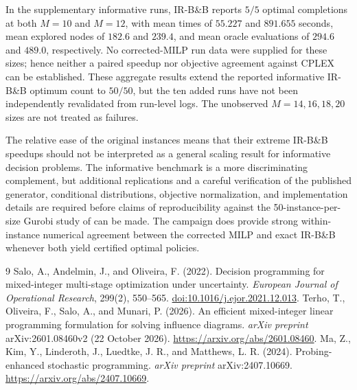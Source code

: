 \documentclass[11pt,a4paper]{article}
\begin{document}
In the supplementary informative runs, IR-B\&B reports $5/5$ optimal completions at both $M=10$ and $M=12$, with mean times of $55.227$ and $891.655$ seconds, mean explored nodes of $182.6$ and $239.4$, and mean oracle evaluations of $294.6$ and $489.0$, respectively. No corrected-MILP run data were supplied for these sizes; hence neither a paired speedup nor objective agreement against CPLEX can be established. These aggregate results extend the reported informative IR-B\&B optimum count to $50/50$, but the ten added runs have not been independently revalidated from run-level logs. The unobserved $M=14,16,18,20$ sizes are not treated as failures.

The relative ease of the original instances means that their extreme IR-B\&B speedups should not be interpreted as a general scaling result for informative decision problems. The informative benchmark is a more discriminating complement, but additional replications and a careful verification of the published generator, conditional distributions, objective normalization, and implementation details are required before claims of reproducibility against the 50-instance-per-size Gurobi study of \cite{Terho2026} can be made. The campaign does provide strong within-instance numerical agreement between the corrected MILP and exact IR-B\&B whenever both yield certified optimal policies.

\begin{thebibliography}{9}
 Salo, A., Andelmin, J., and Oliveira, F. (2022). Decision programming for mixed-integer multi-stage optimization under uncertainty. \emph{European Journal of Operational Research}, 299(2), 550--565. \href{https://doi.org/10.1016/j.ejor.2021.12.013}{doi:10.1016/j.ejor.2021.12.013}.
 Terho, T., Oliveira, F., Salo, A., and Munari, P. (2026). An efficient mixed-integer linear programming formulation for solving influence diagrams. \emph{arXiv preprint} arXiv:2601.08460v2 (22 October 2026). \url{https://arxiv.org/abs/2601.08460}.
 Ma, Z., Kim, Y., Linderoth, J., Luedtke, J. R., and Matthews, L. R. (2024). Probing-enhanced stochastic programming. \emph{arXiv preprint} arXiv:2407.10669. \url{https://arxiv.org/abs/2407.10669}.
\end{thebibliography}
\end{document}
